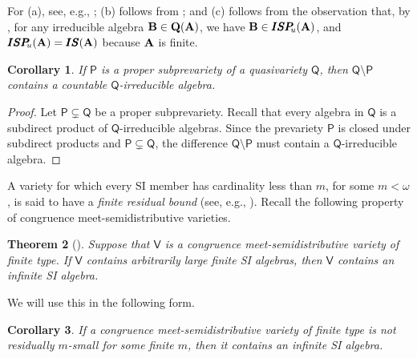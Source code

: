 \documentclass[submission,copyright,creativecommons]{eptcs}
\newtheorem{theorem}{Theorem}[section]
\newtheorem{cor}[theorem]{Corollary}
\theoremstyle{definition}
\newcommand{\alg}[1]{{{\textbf{\upshape #1}}}}
\newcommand{\QQ}{\mathbf{Q}}
\newcommand{\SU}{\pmb{S}}
\newcommand{\II}{\pmb{I}}
\newcommand{\PPu}{\pmb{P}_{\!\!u}}
\newcommand{\vv}[1]{\mathsf {#1}}
\newcommand{\vV}{\vv V}
\newcommand{\Def}[1]{\textit{#1}}
\begin{document}
For (a), see, e.g., \cite[Theorem 3.1.1]{GorbunovBookE}; (b) follows from \cite[Proposition 2.1.15]{GorbunovBookE}; and (c) follows from the observation that, by \cite[Lemma 1.5]{CzelakowskiDziobiakCongruence1990}, for any irreducible algebra $\alg B \in \QQ(\alg A)$, we have $\alg B \in \II\SU\PPu(\alg A)$, and $\II\SU\PPu(\alg A) = \II\SU(\alg A)$ because $\alg A$ is finite.

\begin{cor}\label{cor-countSI}
	If $\vv P$ is a proper subprevariety of a quasivariety $\vv Q$, then $\vv Q \setminus \vv P$ contains a countable $\vv Q$-irreducible algebra.
\end{cor}

\begin{proof}
	Let $\vv{P} \subsetneq \vv Q$ be a proper subprevariety. Recall that every algebra in $\vv{Q}$ is a subdirect product of $\vv{Q}$-irreducible algebras. Since the prevariety $\vv{P}$ is closed under subdirect products and $\vv{P} \subsetneq \vv{Q}$, the difference $\vv{Q}\setminus \vv{P}$ must contain a $\vv{Q}$-irreducible algebra.
\end{proof}


A variety for which every SI member has cardinality less than $m$, for some $m < \omega$, is said to have a \Def{finite residual bound} (see, e.g., \cite[Section~4.3]{McKenzieetBookv2}). Recall the following property of congruence meet-semidistributive varieties.

\begin{theorem}[{\cite[Theorem~4.1]{KearnesWillardResidually1999}}]
	Suppose that $\vV$ is a congruence meet-semidistributive variety of finite type. If $\vV$ contains arbitrarily large finite SI algebras, then $\vV$ contains an infinite SI algebra.
\end{theorem}

We will use this in the following form.
\begin{cor}\label{cor-KW}
	If a congruence meet-semidistributive variety of finite type is not residually $m$-small for some finite $m$, then it contains an infinite SI algebra.
\end{cor}

\end{document}
